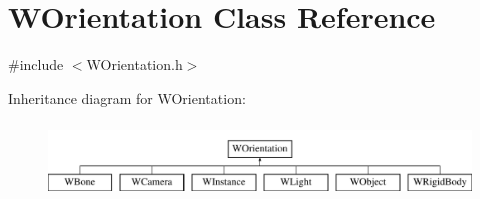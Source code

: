 \hypertarget{class_w_orientation}{}\section{W\+Orientation Class Reference}
\label{class_w_orientation}


{\ttfamily \#include $<$W\+Orientation.\+h$>$}

Inheritance diagram for W\+Orientation\+:\begin{figure}[H]
\begin{center}
\leavevmode
\includegraphics[height=2.000000cm]{class_w_orientation}
\end{center}
\end{figure}
